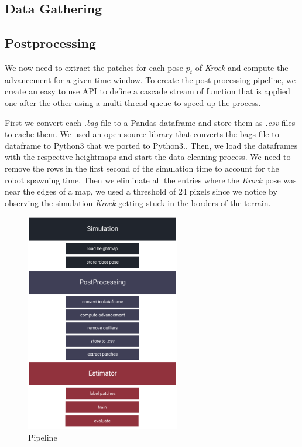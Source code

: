 \documentclass[../document.tex]{subfiles}
\begin{document}
\subsection{Data Gathering}
\subsection{Postprocessing}
We now need to extract the patches for each pose $p_t$ of \emph{Krock} and compute the advancement for a given time window. To create the post processing pipeline, we create an easy to use API  to define a cascade stream of function that is applied one after the other using a multi-thread queue to speed-up the process.

First we convert each \emph{.bag} file to a Pandas dataframe and store them as \emph{.csv} files to cache them. We used an open source library that converts the bags file to dataframe to Python3 that we ported to Python3..
Then, we load the dataframes with the respective heightmaps and start the data cleaning process. We need to remove the rows in the first second of the simulation time to account for the robot spawning time. Then we eliminate all the entries where the \emph{Krock} pose was near the edges of a map, we used a threshold of $24$ pixels  since we notice by observing the simulation \emph{Krock} getting stuck in the borders of the terrain.
\begin{figure}[H]
\centering
\includegraphics[width=0.6\textwidth]{img/pipeline}
\caption{Pipeline}
\label{fig: pipeline}
\end{figure}
\end{document}
